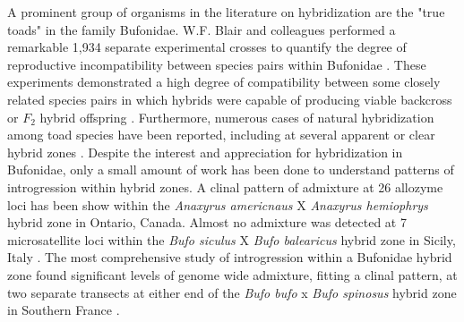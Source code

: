 A prominent group of organisms in the literature on hybridization are the "true
toads" in the family Bufonidae. 
W.F. Blair and colleagues performed a remarkable 1,934 separate experimental crosses 
to quantify the degree of reproductive incompatibility between species pairs within
Bufonidae \parencite{blair1972,malone2008}.
These experiments demonstrated a high degree of compatibility between some closely 
related species pairs in which hybrids were capable of producing viable backcross 
or $F_2$ hybrid offspring \parencite{blair1963}.
Furthermore, numerous cases of natural hybridization among toad species have been 
reported, including at several apparent or clear hybrid zones 
\parencite{green1996,vanriemsdijk2023,colliard2010,weatherby1982}.
Despite the interest and appreciation for hybridization in Bufonidae, only a 
small amount of work has been done to understand patterns of introgression
within hybrid zones. 
A clinal pattern of admixture at 26 allozyme loci has been show within the 
\textit{Anaxyrus americnaus} X \textit{Anaxyrus hemiophrys} hybrid zone in 
Ontario, Canada\parencite{green1983}.
Almost no admixture was detected at 7 microsatellite loci within the \textit{Bufo siculus} X 
\textit{Bufo balearicus} hybrid zone in Sicily, Italy \parencite{colliard2010}.
The most comprehensive study of introgression within a Bufonidae hybrid zone found 
significant levels of genome wide admixture, fitting a clinal pattern, at two separate transects 
at either end of the \textit{Bufo bufo} x \textit{Bufo spinosus} hybrid zone
in Southern France \parencite{vanriemsdijk2023}.

